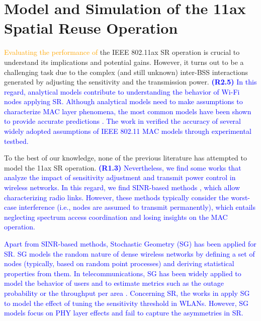 \documentclass{ieeeaccess}
\begin{document}
\section{Model and Simulation of the 11ax Spatial Reuse Operation}
\label{section:analytical_model}

\textcolor{orange}{Evaluating the performance of} the IEEE 802.11ax SR operation is crucial to understand its implications and potential gains. However, it turns out to be a challenging task due to the complex (and still unknown) inter-BSS interactions generated by adjusting the sensitivity and the transmission power. \textcolor{blue}{\textbf{(R2.5)} In this regard, analytical models contribute to understanding the behavior of Wi-Fi nodes applying SR. Although analytical models need to make assumptions to characterize MAC layer phenomena, the most common models have been shown to provide accurate predictions \cite{malone2007verification, huang2010validity}. The work in \cite{malone2007verification} verified the accuracy of several widely adopted assumptions of IEEE 802.11 MAC models through experimental testbed.}

To the best of our knowledge, none of the previous literature has attempted to model the 11ax SR operation. \textcolor{blue}{\textbf{(R1.3)} Nevertheless, we find some works that analyze the impact of sensitivity adjustment and transmit power control in wireless networks. In this regard, we find SINR-based methods \cite{gupta2000capacity, guo2003spatial}, which allow characterizing radio links. However, these methods typically consider the worst-case interference (i.e., nodes are assumed to transmit permanently), which entails neglecting spectrum access coordination and losing insights on the MAC operation.}

\textcolor{blue}{Apart from SINR-based methods, Stochastic Geometry (SG) has been applied for SR. SG models the random nature of dense wireless networks by defining a set of nodes (typically, based on random point processes) and deriving statistical properties from them. In telecommunications, SG has been widely applied to model the behavior of users and to estimate metrics such as the outage probability or the throughput per area \cite{elsawy2016modeling}. Concerning SR, the works in \cite{zhao2016stochastic, zhang2015stochastic, iwata2019stochastic} apply SG to model the effect of tuning the sensitivity threshold in WLANs. However, SG models focus on PHY layer effects and fail to capture the asymmetries in SR.}
\end{document}
